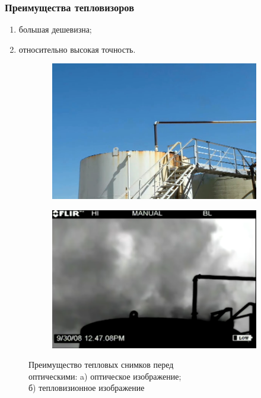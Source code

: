 \documentclass[t]{beamer}
\begin{document}
	\begin{frame}
		\frametitle{Преимущества тепловизоров}
		\begin{enumerate}
			\justifying
			\item большая дешевизна;
			\item относительно высокая точность.
		\end{enumerate}
		\begin{figure}[ht!]
			\begin{subfigure}{.45\textwidth}
				\centering
				\includegraphics[width = \textwidth]{image/optic_invis}
				\caption{}
			\end{subfigure}
			\begin{subfigure}{.45\textwidth}
				\centering
				\includegraphics[width = \textwidth]{image/tep_vis}
				\caption{}
			\end{subfigure}
			\centering
			\caption{Преимущество тепловых снимков перед\\ оптическими: a) оптическое изображение;\\ б) тепловизионное изображение}
			\label{fig:Examples}
		\end{figure}
	\end{frame}
\end{document}
